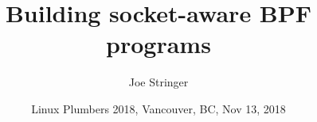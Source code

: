 \documentclass[black,white]{beamer}
\title{Building socket-aware BPF programs}
\institute{Cilium.io}
\author[Joe Stringer]{Joe Stringer}
\date[Nov 13, 2018]{Linux Plumbers 2018, Vancouver, BC, \footnotesize{Nov 13, 2018}}
\begin{document}
        \begin{frame}
        \titlepage
        \end{frame}
\end{document}
